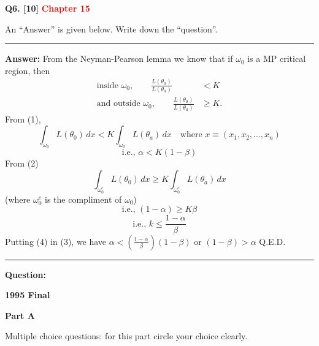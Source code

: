 \documentclass[11pt]{article}
\begin{document}
\bigskip
\textbf{Q6. [10]}  \textbf{\textcolor{red}{Chapter 15}}

An ``Answer'' is given below. Write down the ``question''.

\medskip
\hrule
\medskip

\textbf{Answer:} From the Neyman-Pearson lemma we know that if $\omega_0$ is a MP critical region, then
\begin{align}
\text{inside }\omega_0,\qquad \frac{L(\theta_0)}{L(\theta_a)}&<K \tag{1}\\
\text{and outside }\omega_0,\qquad \frac{L(\theta_0)}{L(\theta_a)}&\ge K. \tag{2}
\end{align}
From (1),
\[
\int_{\omega_0}L(\theta_0)\,dx<K\int_{\omega_0}L(\theta_a)\,dx
\quad\text{where }x\equiv(x_1,x_2,\ldots,x_n)
\]
\begin{equation}
\text{i.e., }\alpha<K(1-\beta) \tag{3}
\end{equation}
From (2)
\[
\int_{\omega_0^c}L(\theta_0)\,dx\ge K\int_{\omega_0^c}L(\theta_a)\,dx
\]
(where $\omega_0^c$ is the compliment of $\omega_0$)
\[
\text{i.e., }(1-\alpha)\ge K\beta
\]
\begin{equation}
\text{i.e., }k\le\frac{1-\alpha}{\beta} \tag{4}
\end{equation}
Putting (4) in (3), we have $\alpha<\left(\frac{1-\alpha}{\beta}\right)(1-\beta)$ or $(1-\beta)>\alpha$ Q.E.D.

\medskip
\hrule
\medskip
\textbf{Question:}


\clearpage

\begin{center}
    {\Large\bfseries 1995 Final}
\end{center}

\vspace{1em}

\begin{center}
\textbf{Part A}
\end{center}

\begingroup
\small
\setlength{\parskip}{0.1em}
Multiple choice questions: for this part circle your choice clearly.
\end{document}
